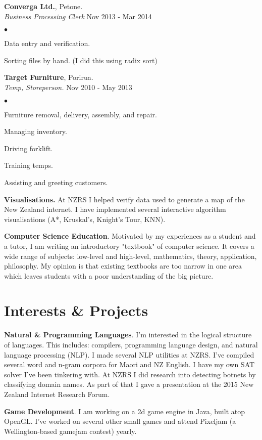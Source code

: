 \documentclass[margin,line]{res}
\newenvironment{list2}{
  \begin{list}{$\bullet$}{%
      \setlength{\itemsep}{0in}
      \setlength{\parsep}{0in} \setlength{\parskip}{0in}
      \setlength{\topsep}{0in} \setlength{\partopsep}{0in}
      \setlength{\leftmargin}{0.2in}}}{\end{list}}
\begin{document}
\begin{resume}
{\bf Converga Ltd.}, Petone. \\
{\em Business Processing Clerk} \hfill {Nov 2013 - Mar 2014}
\begin{list2} %
	\item Data entry and verification.
	\item Sorting files by hand. (I did this using radix sort)
\end{list2}

{\bf Target Furniture}, Porirua. \\
{\em Temp, Storeperson.} \hfill{Nov 2010 - May 2013}
\begin{list2} %
	\item Furniture removal, delivery, assembly, and repair. 
	\item Managing inventory.
	\item Driving forklift.
	\item Training temps.
	\item Assisting and greeting customers.
\end{list2}

{\bf Visualisations.} At NZRS I helped verify data used to generate a map of the New Zealand internet. I have implemented several interactive algorithm visualisations (A*, Kruskal's, Knight's Tour, KNN).

{\bf Computer Science Education}. Motivated by my experiences as a student and a tutor, I am writing an introductory "textbook" of computer science. It covers a wide range of subjects: low-level and high-level, mathematics, theory, application, philosophy. My opinion is that existing textbooks are too narrow in one area which leaves students with a poor understanding of the big picture.

\section{\sc Interests \& Projects}
{\bf Natural \& Programming Languages}. I'm interested in the logical structure of languages. This includes: compilers, programming language design, and natural language processing (NLP). I made several NLP utilities at NZRS. I've compiled several word and n-gram corpora for Maori and NZ English. I have my own SAT solver I've been tinkering with. At NZRS I did research into detecting botnets by classifying domain names. As part of that I gave a presentation at the 2015 New Zealand Internet Research Forum.

{\bf Game Development}.  I am working on a 2d game engine in Java, built atop OpenGL. I've worked on several other small games and attend Pixeljam (a Wellington-based gamejam contest) yearly.


\end{resume}
\end{document}
